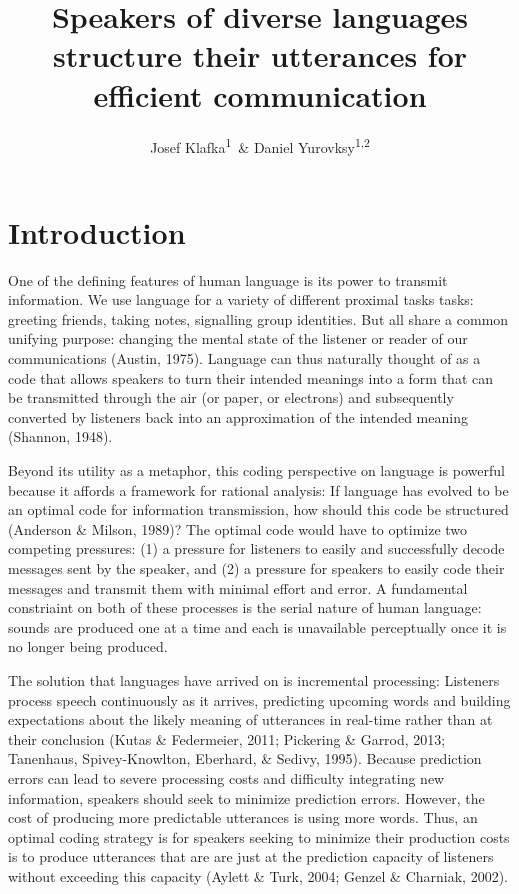 \documentclass[man,floatsintext]{apa6}
\title{Speakers of diverse languages structure their utterances for efficient communication}
\author{Josef Klafka\textsuperscript{1}~\& Daniel Yurovksy\textsuperscript{1,2}}
\date{}
\affiliation{
\vspace{0.5cm}
\textsuperscript{1} Carnegie Mellon University\\\textsuperscript{2} University of Chicago}
\begin{document}
\maketitle

\hypertarget{introduction}{%
\section{Introduction}\label{introduction}}

One of the defining features of human language is its power to transmit information. We use language for a variety of different proximal tasks tasks: greeting friends, taking notes, signalling group identities. But all share a common unifying purpose: changing the mental state of the listener or reader of our communications (Austin, 1975). Language can thus naturally thought of as a code that allows speakers to turn their intended meanings into a form that can be transmitted through the air (or paper, or electrons) and subsequently converted by listeners back into an approximation of the intended meaning (Shannon, 1948).

Beyond its utility as a metaphor, this coding perspective on language is powerful because it affords a framework for rational analysis: If language has evolved to be an optimal code for information transmission, how should this code be structured (Anderson \& Milson, 1989)? The optimal code would have to optimize two competing pressures: (1) a pressure for listeners to easily and successfully decode messages sent by the speaker, and (2) a pressure for speakers to easily code their messages and transmit them with minimal effort and error. A fundamental constriaint on both of these processes is the serial nature of human language: sounds are produced one at a time and each is unavailable perceptually once it is no longer being produced.

The solution that languages have arrived on is incremental processing: Listeners process speech continuously as it arrives, predicting upcoming words and building expectations about the likely meaning of utterances in real-time rather than at their conclusion (Kutas \& Federmeier, 2011; Pickering \& Garrod, 2013; Tanenhaus, Spivey-Knowlton, Eberhard, \& Sedivy, 1995). Because prediction errors can lead to severe processing costs and difficulty integrating new information, speakers should seek to minimize prediction errors. However, the cost of producing more predictable utterances is using more words. Thus, an optimal coding strategy is for speakers seeking to minimize their production costs is to produce utterances that are are just at the prediction capacity of listeners without exceeding this capacity (Aylett \& Turk, 2004; Genzel \& Charniak, 2002).
\end{document}
